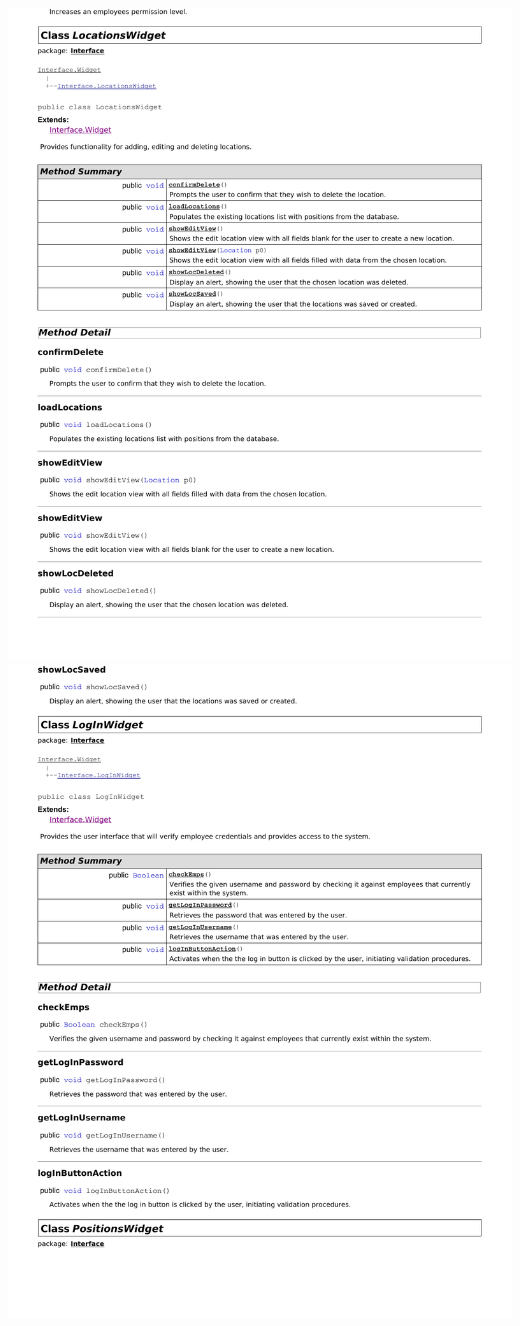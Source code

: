 \documentclass[letterpaper,12pt]{report}
\begin{document}
\newpage
\includegraphics[scale=0.9,trim=20mm 30mm 25mm 25mm]{externals/di4.pdf}
\newpage
\includegraphics[scale=0.9,trim=20mm 30mm 25mm 25mm]{externals/di5.pdf}
\end{document}
